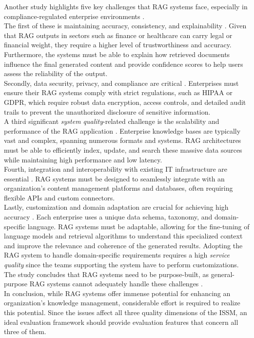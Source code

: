\documentclass[
	english,
	ruledheaders=section,%
	class=report,%
	thesis={type=bachelor},%
	accentcolor=1b,%
	custommargins=true,%
	marginpar=false,%
	parskip=half-,%
	fontsize=11pt,%
	DIV=14,
]{tudapub}
\begin{document}
Another study highlights five key challenges that RAG systems face, especially in compliance-regulated enterprise environments \parencite[p.~6]{Bruckhaus2024RAG}.\\
The first of these is maintaining accuracy, consistency, and explainability \parencite[p.~6]{Bruckhaus2024RAG}. Given that RAG outputs in sectors such as finance or healthcare can carry legal or financial weight, they require a higher level of trustworthiness and accuracy. Furthermore, the systems must be able to explain how retrieved documents influence the final generated content and provide confidence scores to help users assess the reliability of the output.\\
Secondly, data security, privacy, and compliance are critical \parencite[p.~6]{Bruckhaus2024RAG}. Enterprises must ensure their RAG systems comply with strict regulations, such as HIPAA or GDPR, which require robust data encryption, access controls, and detailed audit trails to prevent the unauthorized disclosure of sensitive information.\\
A third significant \textit{system quality}-related challenge is the scalability and performance of the RAG application \parencite[p.~6]{Bruckhaus2024RAG}. Enterprise knowledge bases are typically vast and complex, spanning numerous formats and systems. RAG architectures must be able to efficiently index, update, and search these massive data sources while maintaining high performance and low latency.\\
Fourth, integration and interoperability with existing IT infrastructure are essential \parencite[p.~6]{Bruckhaus2024RAG}. RAG systems must be designed to seamlessly integrate with an organization's content management platforms and databases, often requiring flexible APIs and custom connectors.\\
Lastly, customization and domain adaptation are crucial for achieving high accuracy \parencite[p.~6]{Bruckhaus2024RAG}. Each enterprise uses a unique data schema, taxonomy, and domain-specific language. RAG systems must be adaptable, allowing for the fine-tuning of language models and retrieval algorithms to understand this specialized context and improve the relevance and coherence of the generated results. Adopting the RAG system to handle domain-specific requirements requires a high \textit{service quality} since the teams supporting the system have to perform customizations.\\
The study concludes that RAG systems need to be purpose-built, as general-purpose RAG systems cannot adequately handle these challenges \parencite[pp.~6--7]{Bruckhaus2024RAG}.\\
In conclusion, while RAG systems offer immense potential for enhancing an organization's knowledge management, considerable effort is required to realize this potential. Since the issues affect all three quality dimensions of the ISSM, an ideal evaluation framework should provide evaluation features that concern all three of them.
\end{document}
